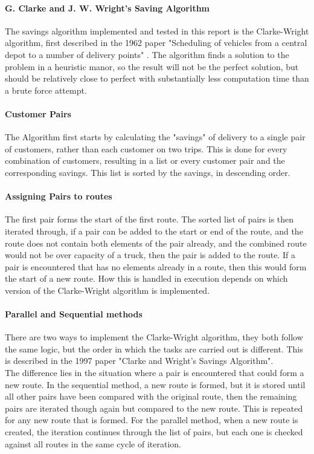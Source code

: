 \documentclass[conference]{acmsiggraph}
\begin{document}
\paragraph{G. Clarke and J. W. Wright's Saving Algorithm}
The savings algorithm implemented and tested in this report is the Clarke-Wright algorithm, first described in the 1962 paper "Scheduling of vehicles from a central depot to a number of delivery points" \cite{CW}.
The algorithm finds a solution to the problem in a heuristic manor, so the result will not be the perfect solution, but should be relatively close to perfect with substantially less computation time than a brute force attempt. 

\paragraph{Customer Pairs}
The Algorithm first starts by calculating the "savings" of delivery to a single pair of customers, rather than each customer on two trips. This is done for every combination of customers, resulting in a list or every customer pair and the corresponding savings. This list is sorted by the savings, in descending order.

\paragraph{Assigning Pairs to routes}
The first pair forms the start of the first route. The sorted list of pairs is then iterated through, if a pair can be added to the start or end of the route, and the route does not contain both elements of the pair already, and the combined route would not be over capacity of a truck, then the pair is added to the route. If a pair is encountered that has no elements already in a route, then this would form the start of a new route. How this is handled in execution depends on which version of the Clarke-Wright algorithm is implemented.

\paragraph{Parallel and Sequential methods}
There are two ways to implement the Clarke-Wright algorithm, they both follow the same logic, but the order in which the tasks are carried out is different. This is described in the 1997 paper "Clarke and Wright's Savings Algorithm"\cite{CWj}.\\
The difference lies in the situation where a pair is encountered that could form a new route. In the sequential method, a new route is formed, but it is stored until all other pairs have been compared with the original route, then the remaining pairs are iterated though again but compared to the new route. This is repeated for any new route that is formed.
For the parallel method, when a new route is created, the iteration continues through the list of pairs, but each one is checked against all routes in the same cycle of iteration.
\end{document}
